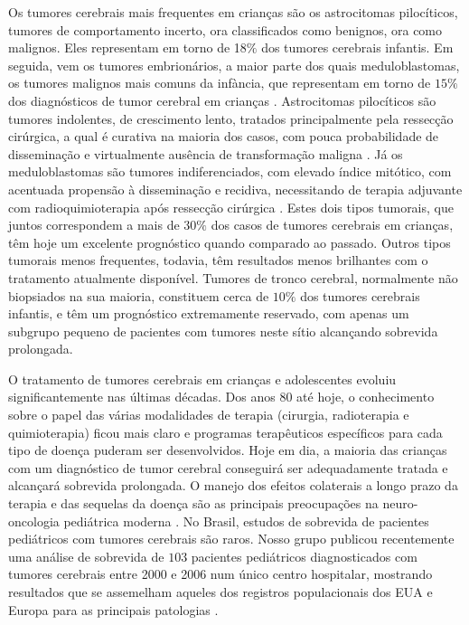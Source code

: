 \documentclass[11pt,a4paper,oldfontcommands]{memoir}
\begin{document}
Os tumores cerebrais mais frequentes em crianças são os astrocitomas pilocíticos, tumores de comportamento incerto, ora classificados como benignos, ora como malignos. Eles representam em torno de 1\(8\%\) dos tumores cerebrais infantis. Em seguida, vem os tumores embrionários, a maior parte dos quais meduloblastomas, os tumores malignos mais comuns da infància, que representam em torno de \(15\%\) dos diagnósticos de tumor cerebral em crianças \cite{Ostrom01102014}. Astrocitomas pilocíticos são tumores indolentes, de crescimento lento, tratados principalmente pela ressecção cirúrgica, a qual é curativa na maioria dos casos, com pouca probabilidade de disseminação e virtualmente ausência de transformação maligna \cite{gan}. Já os meduloblastomas são tumores indiferenciados, com elevado índice mitótico, com acentuada propensão à disseminação e recidiva, necessitando de terapia adjuvante com radioquimioterapia após ressecção cirúrgica \cite{partap}. Estes dois tipos tumorais, que juntos correspondem a mais de \(30\%\) dos casos de tumores cerebrais em crianças, têm hoje um excelente prognóstico quando comparado ao passado. Outros tipos tumorais menos frequentes, todavia, têm resultados menos brilhantes com o tratamento atualmente disponível. Tumores de tronco cerebral, normalmente não biopsiados na sua maioria, constituem cerca de \(10\%\) dos tumores cerebrais infantis, e têm um prognóstico extremamente reservado, com apenas um subgrupo pequeno de pacientes com tumores neste sítio alcançando sobrevida prolongada.

O tratamento de tumores cerebrais em crianças e adolescentes evoluiu significantemente nas últimas décadas. Dos anos 80 até hoje, o conhecimento sobre o papel das várias modalidades de terapia (cirurgia, radioterapia e quimioterapia) ficou mais claro e programas terapêuticos específicos para cada tipo de doença puderam ser desenvolvidos. Hoje em dia, a maioria das crianças com um diagnóstico de tumor cerebral conseguirá ser adequadamente tratada e alcançará sobrevida prolongada. O manejo dos efeitos colaterais a longo prazo da terapia e das sequelas da doença são as principais preocupações na neuro-oncologia pediátrica moderna \cite{merchant}. No Brasil, estudos de sobrevida de pacientes pediátricos com tumores cerebrais são raros. Nosso grupo publicou recentemente uma análise de sobrevida de \(103\) pacientes pediátricos diagnosticados com tumores cerebrais entre 2000 e 2006 num único centro hospitalar, mostrando resultados que se assemelham aqueles dos registros populacionais dos EUA e Europa para as principais patologias \cite{araujo}.
\end{document}
